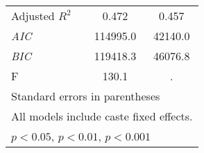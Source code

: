 \begin{table}[htbp]
\begin{tabular}{l*{2}{c}}
Adjusted \(R^{2}\)&    0.472         &    0.457         \\
\textit{AIC}    & 114995.0         &  42140.0         \\
\textit{BIC}    & 119418.3         &  46076.8         \\
F               &    130.1         &        .         \\
\hline\hline
\multicolumn{3}{l}{\footnotesize Standard errors in parentheses}\\
\multicolumn{3}{l}{\footnotesize All models include caste fixed effects.}\\
\multicolumn{3}{l}{\footnotesize \sym{*} \(p<0.05\), \sym{**} \(p<0.01\), \sym{***} \(p<0.001\)}\\
\end{tabular}
\end{table}
